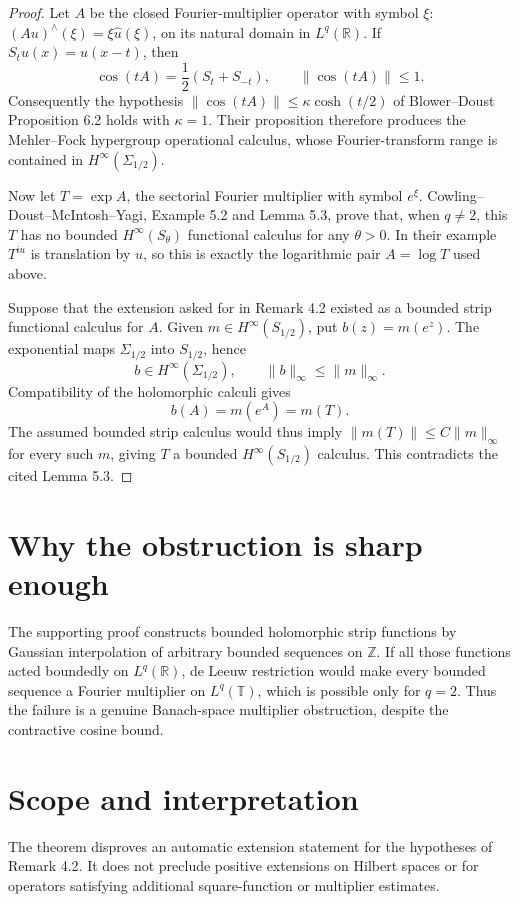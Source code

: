 \documentclass[11pt]{article}
\newcommand{\R}{\mathbb R}
\begin{document}
\begin{proof}
Let \(A\) be the closed Fourier-multiplier operator with symbol \(\xi\):
\((Au)^\wedge(\xi)=\xi\widehat u(\xi)\), on its natural domain in
\(L^q(\R)\).  If \(S_tu(x)=u(x-t)\), then
\[
 \cos(tA)=\frac12(S_t+S_{-t}),
 \qquad \|\cos(tA)\|\leq1.
\]
Consequently the hypothesis
\(\|\cos(tA)\|\leq\kappa\cosh(t/2)\) of
Blower--Doust Proposition 6.2 holds with \(\kappa=1\).  Their proposition
therefore produces the Mehler--Fock hypergroup operational calculus, whose
Fourier-transform range is contained in \(H^\infty(\Sigma_{1/2})\).

Now let \(T=\exp A\), the sectorial Fourier multiplier with symbol
\(e^\xi\).  Cowling--Doust--McIntosh--Yagi, Example 5.2 and Lemma 5.3,
prove that, when \(q\neq2\), this \(T\) has no bounded
\(H^\infty(S_\theta)\) functional calculus for any \(\theta>0\).  In their
example \(T^{iu}\) is translation by \(u\), so this is exactly the logarithmic
pair \(A=\log T\) used above.

Suppose that the extension asked for in Remark 4.2 existed as a bounded strip
functional calculus for \(A\).  Given \(m\in H^\infty(S_{1/2})\), put
\(b(z)=m(e^z)\).  The exponential maps \(\Sigma_{1/2}\) into
\(S_{1/2}\), hence
\[
 b\in H^\infty(\Sigma_{1/2}),\qquad
 \|b\|_\infty\leq\|m\|_\infty.
\]
Compatibility of the holomorphic calculi gives
\[
 b(A)=m(e^A)=m(T).
\]
The assumed bounded strip calculus would thus imply
\(\|m(T)\|\leq C\|m\|_\infty\) for every such \(m\), giving \(T\) a
bounded \(H^\infty(S_{1/2})\) calculus.  This contradicts the cited Lemma
5.3.
\end{proof}

\section*{Why the obstruction is sharp enough}
The supporting proof constructs bounded holomorphic strip functions by
Gaussian interpolation of arbitrary bounded sequences on \(\mathbb Z\).  If
all those functions acted boundedly on \(L^q(\R)\), de Leeuw restriction would
make every bounded sequence a Fourier multiplier on \(L^q(\mathbb T)\), which
is possible only for \(q=2\).  Thus the failure is a genuine Banach-space
multiplier obstruction, despite the contractive cosine bound.

\section*{Scope and interpretation}
The theorem disproves an automatic extension statement for the hypotheses of
Remark 4.2.  It does not preclude positive extensions on Hilbert spaces or for
operators satisfying additional square-function or multiplier estimates.
\end{document}
